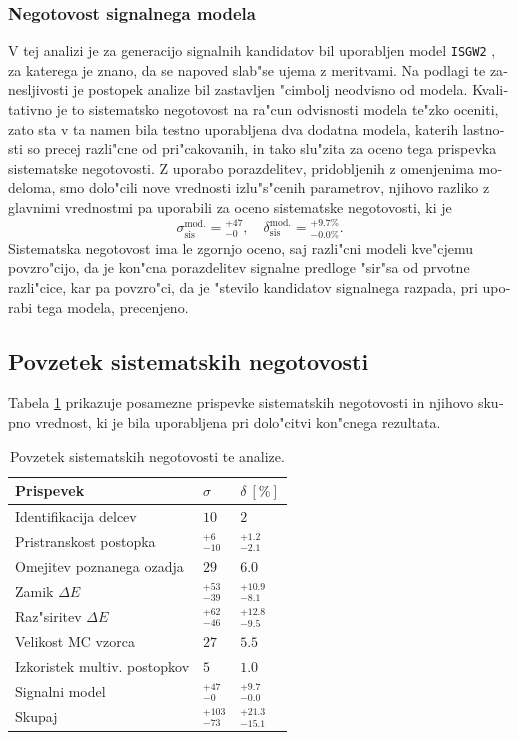 \begin{otherlanguage}{slovene}
\subsubsection{Negotovost signalnega modela}
V tej analizi je za generacijo signalnih kandidatov bil uporabljen model \texttt{ISGW2} \cite{Scora:1995ty}, za katerega je znano, da se napoved slab"se ujema z meritvami. Na podlagi te zanesljivosti je postopek analize bil zastavljen "cimbolj neodvisno od modela. Kvalitativno je to sistematsko negotovost na ra"cun odvisnosti modela te"zko oceniti, zato sta v ta namen bila testno uporabljena dva dodatna modela, katerih lastnosti so precej razli"cne od pri"cakovanih, in tako slu"zita za oceno tega prispevka sistematske negotovosti. Z uporabo porazdelitev, pridobljenih z omenjenima modeloma, smo dolo"cili nove vrednosti izlu"s"cenih parametrov, njihovo razliko z glavnimi vrednostmi pa uporabili za oceno sistematske negotovosti, ki je
\begin{equation}
\sigma_{\mathrm{sis}}^{\mathrm{mod.}} = {}^{+47}_{-0},\quad \delta_{\mathrm{sis}}^{\mathrm{mod.}} = {}^{+9.7\%}_{-0.0\%}.
\end{equation}
Sistematska negotovost ima le zgornjo oceno, saj razli"cni modeli kve"cjemu povzro"cijo, da je kon"cna porazdelitev signalne predloge "sir"sa od prvotne razli"cice, kar pa povzro"ci, da je "stevilo kandidatov signalnega razpada, pri uporabi tega modela, precenjeno.

\subsection{Povzetek sistematskih negotovosti}

Tabela \ref{tab:sys_summary_si} prikazuje posamezne prispevke sistematskih negotovosti in njihovo skupno vrednost, ki je bila uporabljena pri dolo"citvi kon"cnega rezultata.

\begin{table}[H]
	\centering
	\begin{tabular}{l|l|l}
		Prispevek & $\sigma$ & $\delta~[\%]$ \\
		\toprule
		Identifikacija delcev & $10$ & $2$ \\
		Pristranskost postopka & $ {}^{+6}_{-10}$ & ${}^{+1.2}_{-2.1}$ \\
		Omejitev poznanega ozadja & $29$ & $6.0$ \\
		Zamik $\Delta E$ & ${}^{+53}_{-39}$ & ${}^{+10.9}_{-8.1}$ \\
		Raz"siritev $\Delta E$ & ${}^{+62}_{-46}$ & ${}^{+12.8}_{-9.5}$ \\
		Velikost MC vzorca & $27$ & $5.5$ \\
		Izkoristek multiv. postopkov & $5$ & $1.0$\\
		Signalni model & ${}^{+47}_{-0}$ & ${}^{+9.7}_{-0.0}$ \\
		\midrule
		Skupaj & ${} ^{+103}_{-73}$ & ${}^{+21.3}_{-15.1}$ \\
		\bottomrule
	\end{tabular}
	\captionsetup{width=0.8\linewidth}
	\caption{Povzetek sistematskih negotovosti te analize.}
	\label{tab:sys_summary_si}
\end{table}

\end{otherlanguage}
